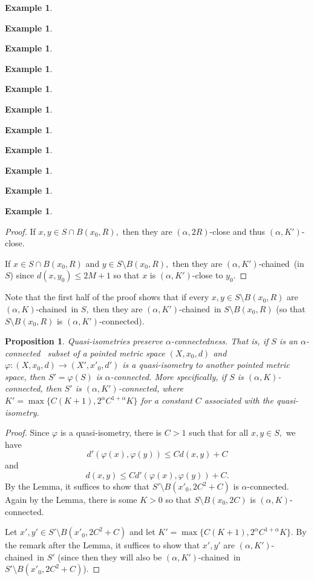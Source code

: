 \documentclass[12pt]{amsart}
\newtheorem{proposition}[theorem]{Proposition}
\theoremstyle{definition}
\newtheorem{example}[theorem]{Example}
\theoremstyle{remark}
\numberwithin{equation}{section}
\newcommand{\ph}{\varphi}
\newcommand{\akch}{$(\alpha,K)$-chained}
\newcommand{\akpch}{$(\alpha,K')$-chained}
\newcommand{\akconn}{$(\alpha,K)$-connected}
\newcommand{\akpconn}{$(\alpha,K')$-connected}
\newcommand{\aconn}{$\alpha$-connected}
\begin{document}
\begin{example}
\begin{example}
\begin{example}
\begin{example}
\begin{example}
\begin{example}
\begin{example}
\begin{example}
\begin{example}
\begin{example}
\begin{example}
\begin{proof}
If $x,y \in S \cap B(x_0,R),$ then they are $(\alpha,2R)$-close and
thus $(\alpha,K')$-close.

If $x \in S \cap B(x_0,R)$ and $y \in S \setminus B(x_0,R),$ then they
are \akpch \ (in $S$) since $d(x,y_0) \leq 2M+1$ so that $x$ is
$(\alpha,K')$-close to $y_0.$
\end{proof}

Note that the first half of the proof shows that if every $x,y \in
S\setminus B(x_0,R)$ are \akch \ in $S,$ then they are \akpch \ in
$S\setminus B(x_0,R)$ (so that $S\setminus B(x_0,R)$ is \akpconn).

\begin{proposition}\label{aconninvariance}
Quasi-isometries preserve \aconn ness. That is, if $S$ is an \aconn
\ subset of a pointed metric space $(X,x_0,d)$ and $\ph: (X,x_0,d) \to
(X',x'_0,d')$ is a quasi-isometry to another pointed metric space,
then $S'=\ph(S)$ is \aconn. More specifically, if $S$ is \akconn, then
$S'$ is \akpconn, where $K'=\max\{C(K+1), 2^\alpha C^{1+\alpha} K\}$
for a constant $C$ associated with the quasi-isometry.
\end{proposition}

\begin{proof}
Since $\ph$ is a quasi-isometry, there is $C>1$ such that for all $x,y
\in S,$ we have
\begin{equation*}
d'(\ph(x),\ph(y)) \leq Cd(x,y)+C
\end{equation*}
and
\begin{equation*}d(x,y) \leq Cd'(\ph(x),\ph(y))+C.
\end{equation*}
By the Lemma, it suffices to show that $S' \setminus B(x'_0,2C^2 +C)$
is \aconn. Again by the Lemma, there is some $K > 0$ so that $S
\setminus B(x_0,2C)$ is \akconn.

Let $x',y' \in S' \setminus B(x'_0,2C^2 +C)$ and let $K'=\max\{C(K+1),
2^\alpha C^{1+\alpha} K\}.$ By the remark after the Lemma, it suffices
to show that $x',y'$ are \akpch \ in $S'$ (since then they will also
be \akpch \ in $S' \setminus B(x'_0,2C^2 +C)$).


\end{proof}
\end{example}
\end{example}
\end{example}
\end{example}
\end{example}
\end{example}
\end{example}
\end{example}
\end{example}
\end{example}
\end{example}
\end{document}
